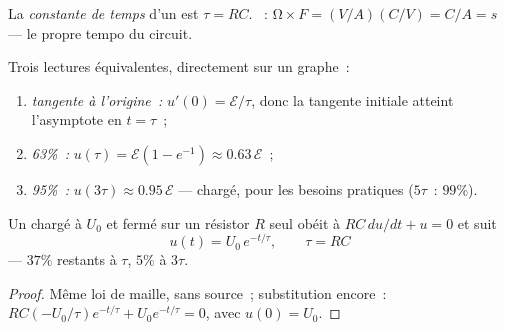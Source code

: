 \begin{definition}\label{def:g12:rc-rl-circuits:tau}
La \emph{constante de temps} d'un
 est $\tau = RC$.
~: $\unit{\ohm} \times \unit{F} =
(\unit{V/A})(\unit{C/V}) = \unit{C/A} = \unit{s}$ --- le propre
tempo du circuit.
\end{definition}

\begin{method}\label{met:g12:rc-rl-circuits:reading}
Trois lectures équivalentes, directement sur un graphe~:
\begin{enumerate}
  \item \emph{tangente à l'origine~:} $u'(0) = \mathcal{E}/\tau$, donc
        la tangente initiale atteint l'asymptote en $t = \tau$~;
  \item \emph{63\%~:} $u(\tau) = \mathcal{E}(1 - e^{-1}) \approx
        0.63\,\mathcal{E}$~;
  \item \emph{95\%~:} $u(3\tau) \approx 0.95\,\mathcal{E}$ --- chargé,
        pour les besoins pratiques ($5\tau$~: $99\%$).
\end{enumerate}
\end{method}

\begin{proposition}[Décharge]\label{prop:g12:rc-rl-circuits:discharge}
Un  chargé à $U_0$ et fermé sur un résistor
$R$ seul obéit à $RC\,du/dt + u = 0$ et suit
\[
u(t) = U_0\,e^{-t/\tau}, \qquad \tau = RC
\]
--- $37\%$ restants à $\tau$, $5\%$ à $3\tau$.
\end{proposition}

\begin{proof}
Même loi de maille, sans source~; substitution encore~:
$RC(-U_0/\tau)e^{-t/\tau} + U_0 e^{-t/\tau} = 0$, avec $u(0) = U_0$.
\end{proof}

